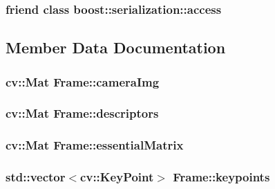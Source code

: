 \subsubsection[{\texorpdfstring{boost\+::serialization\+::access}{boost::serialization::access}}]{\setlength{\rightskip}{0pt plus 5cm}friend class boost\+::serialization\+::access\hspace{0.3cm}{\ttfamily [friend]}}\hypertarget{classFrame_ac98d07dd8f7b70e16ccb9a01abf56b9c}{}\label{classFrame_ac98d07dd8f7b70e16ccb9a01abf56b9c}


\subsection{Member Data Documentation}
\subsubsection[{\texorpdfstring{camera\+Img}{cameraImg}}]{\setlength{\rightskip}{0pt plus 5cm}cv\+::\+Mat Frame\+::camera\+Img}\hypertarget{classFrame_af327ba7e56d6e4cd8f2917d36284ca4c}{}\label{classFrame_af327ba7e56d6e4cd8f2917d36284ca4c}
\subsubsection[{\texorpdfstring{descriptors}{descriptors}}]{\setlength{\rightskip}{0pt plus 5cm}cv\+::\+Mat Frame\+::descriptors}\hypertarget{classFrame_a358eda120b8420754f30f69007e9fecb}{}\label{classFrame_a358eda120b8420754f30f69007e9fecb}
\subsubsection[{\texorpdfstring{essential\+Matrix}{essentialMatrix}}]{\setlength{\rightskip}{0pt plus 5cm}cv\+::\+Mat Frame\+::essential\+Matrix}\hypertarget{classFrame_a07cc311d7b6e3dd5b964a4ea42a003b3}{}\label{classFrame_a07cc311d7b6e3dd5b964a4ea42a003b3}
\subsubsection[{\texorpdfstring{keypoints}{keypoints}}]{\setlength{\rightskip}{0pt plus 5cm}std\+::vector$<$cv\+::\+Key\+Point$>$ Frame\+::keypoints}\hypertarget{classFrame_aec3f6874598eadb1e014709b28e48061}{}\label{classFrame_aec3f6874598eadb1e014709b28e48061}
